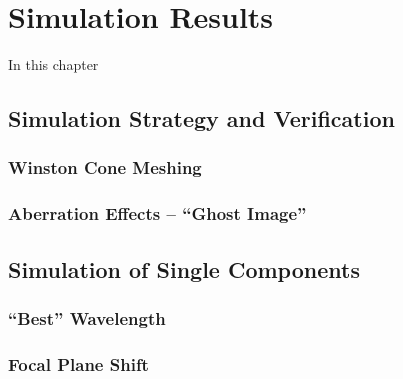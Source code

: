 \chapter{Simulation Results}\label{chap:simresults}

In this chapter

\section{Simulation Strategy and Verification}

\subsection{Winston Cone Meshing}\label{sec:wico_meshing}

\subsection{Aberration Effects -- \enquote{Ghost Image}}

\section{Simulation of Single Components}

\subsection{\enquote{Best} Wavelength}

\subsection{Focal Plane Shift}